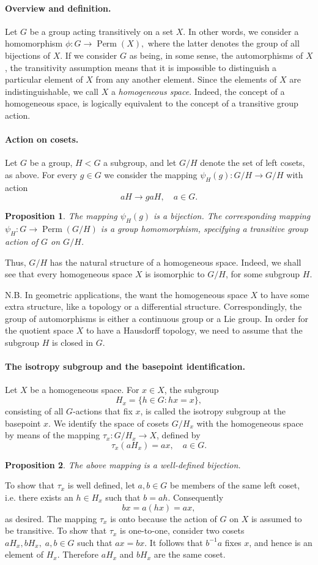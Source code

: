 \documentclass[12pt]{article}
\newtheorem{proposition}{Proposition}
\newcommand{\Perm}{\operatorname{Perm}}
\begin{document}
\paragraph{Overview and definition.}
Let $G$ be a group acting transitively on a set $X$.  In other words,
we consider a homomorphism $\phi:G\to\Perm(X),$ where the latter
denotes the group of all bijections of $X$. If we consider $G$ as
being, in some sense, the automorphisms of $X$, the transitivity
assumption means that it is impossible to distinguish a particular
element of $X$ from any another element.  Since the elements of $X$
are indistinguishable, we call $X$ a \emph{homogeneous space}.
Indeed, the concept of a homogeneous space, is logically equivalent to
the concept of a transitive group action.

\paragraph{Action on cosets.}
Let $G$ be a group, $H<G$ a subgroup, and let $G/H$ denote the set of
left cosets, as above.  For every $g\in G$ we consider the mapping
$\psi_H(g):G/H \to G/H$ with action 
$$a H \to ga H,\quad a\in G.$$
\begin{proposition}
The mapping $\psi_H(g)$ is a bijection.  The
corresponding mapping $\psi_H:G\to\Perm(G/H)$ is a group homomorphism,
specifying a transitive group action of $G$ on $G/H$.
\end{proposition}
Thus, $G/H$ has the natural structure of a homogeneous space.  Indeed,
we shall see that every homogeneous space $X$ is isomorphic to $G/H$,
for some subgroup $H$.

N.B. In geometric applications, the want the homogeneous space $X$ to
have some extra structure, like a topology or a differential
structure.  Correspondingly, the group of automorphisms is either a
continuous group or a Lie group.  In order for the quotient space $X$
to have a Hausdorff topology, we need to assume that the subgroup $H$
is closed in $G$.

\paragraph{The isotropy subgroup and the basepoint identification.}
Let $X$ be a homogeneous space. For $x\in X$, the subgroup
$$H_x = \{ h\in G: hx = x \},$$
consisting of all $G$-actions that fix
$x$, is called the isotropy subgroup at the basepoint $x$.  We
identify the space of cosets $G/H_x$ with the homogeneous space by
means of the mapping $\tau_{x}: G/H_x \to X$, defined by
$$\tau_{x}(aH_x) = ax,\quad a\in G.$$
\begin{proposition}
  The above mapping is a well-defined bijection.
\end{proposition}
To show that $\tau_x$ is well defined, let $a,b\in G$ be members of
the same left coset, i.e.  there exists an $h\in H_x$ such that
$b=ah$.  Consequently
$$bx = a(hx) = ax,$$
as desired.  The mapping $\tau_{x}$ is onto because the action of
$G$ on $X$ is 
assumed to be transitive.  To show that $\tau_x$ is one-to-one, consider
two cosets $aH_x, bH_x,\; a,b\in G$ such that 
$ax=bx$.  It follows that $b^{-1}a$ fixes $x$, and hence is an
element of $H_x$. Therefore $aH_x$ and $bH_x$ are the same coset.
\end{document}
